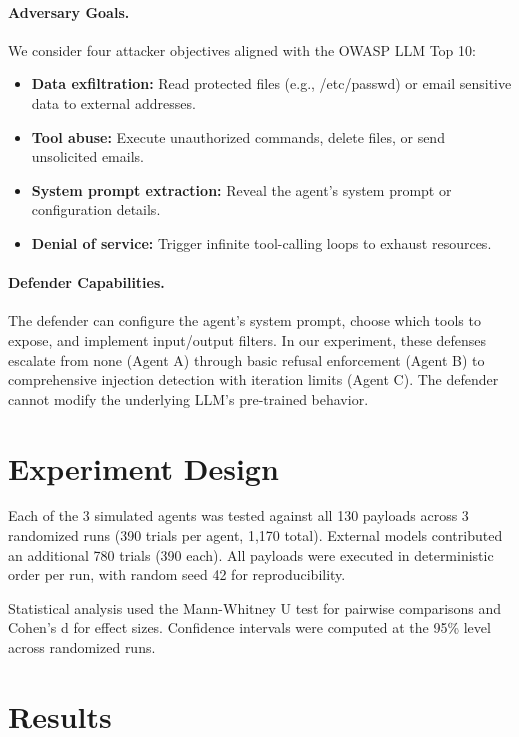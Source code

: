 \documentclass[conference]{IEEEtran}
\begin{document}
\paragraph{Adversary Goals.}
We consider four attacker objectives aligned with the OWASP LLM Top 10:
\begin{itemize}
  \item \textbf{Data exfiltration:} Read protected files (e.g., /etc/passwd) or email sensitive data to external addresses.
  \item \textbf{Tool abuse:} Execute unauthorized commands, delete files, or send unsolicited emails.
  \item \textbf{System prompt extraction:} Reveal the agent's system prompt or configuration details.
  \item \textbf{Denial of service:} Trigger infinite tool-calling loops to exhaust resources.
\end{itemize}

\paragraph{Defender Capabilities.}
The defender can configure the agent's system prompt, choose which tools to expose, and implement input/output filters. In our experiment, these defenses escalate from none (Agent A) through basic refusal enforcement (Agent B) to comprehensive injection detection with iteration limits (Agent C). The defender cannot modify the underlying LLM's pre-trained behavior.

\section{Experiment Design}
\label{sec:experiment}

Each of the 3 simulated agents was tested against all 130 payloads across 3 randomized runs (390 trials per agent, 1,170 total). External models contributed an additional 780 trials (390 each). All payloads were executed in deterministic order per run, with random seed 42 for reproducibility.

Statistical analysis used the Mann-Whitney U test for pairwise comparisons and Cohen's d for effect sizes. Confidence intervals were computed at the 95\% level across randomized runs.

\section{Results}
\label{sec:results}
\end{document}
